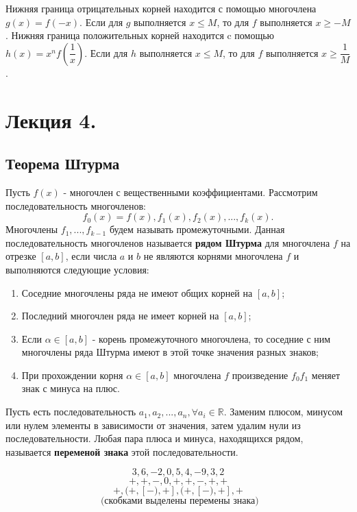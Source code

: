 \documentclass[12pt]{article}
\begin{document}
Нижняя граница отрицательных корней находится с помощью многочлена $g(x) = f(-x)$. Если для $g$ выполняется $x \leq M$, то для $f$ выполняется $x \geq -M$. Нижняя граница положительных корней находится c помощью $h(x) = x^nf(\dfrac{1}{x})$. Если для $h$ выполняется $x \leq M$, то для $f$ выполняется $x \geq \dfrac{1}{M}$.

\section{Лекция 4.}
\subsection{Теорема Штурма}
\begin{defn}
Пусть $f(x)$ - многочлен с вещественными коэффициентами. Рассмотрим последовательность многочленов: $$f_0(x) = f(x), f_1(x), f_2(x), ..., f_k(x).$$ Многочлены $f_1, ..., f_{k-1}$ будем называть промежуточными. Данная последовательность многочленов называется \textbf{рядом Штурма} для многочлена $f$ на отрезке $[a,b]$, если числа $a$ и $b$ не являются корнями многочлена $f$ и выполняются следующие условия:
\begin{enumerate}
\item{Соседние многочлены ряда не имеют общих корней на $[a,b]$;}
\item {Последний многочлен ряда не имеет корней на $[a,b]$;}
\item {Если $\alpha \in [a,b]$ - корень промежуточного многочлена, то соседние с ним многочлены ряда Штурма имеют в этой точке значения разных знаков;}
\item {При прохождении корня $\alpha \in [a,b]$ многочлена $f$ произведение $f_0 f_1$ меняет знак с минуса на плюс.}
\end{enumerate}
\end{defn}

\begin{defn}
Пусть есть последовательность $a_1, a_2, ..., a_n, \forall a_i \in \mathbb{R}.$ Заменим плюсом, минусом или нулем элементы в зависимости от значения, затем удалим нули из последовательности. Любая пара плюса и минуса, находящихся рядом, называется \textbf{переменой знака} этой последовательности.
\end{defn}
\begin{examp}
$$3,6,-2,0,5,4,-9,3,2$$
$$+,+,-,0,+,+,-,+,+$$
$$+,(+,[-),+],(+,[-),+],+ $$
$$\text{   (скобками выделены перемены знака)}$$ 
\end{examp}
\end{document}
